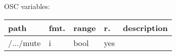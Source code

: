 \begin{snugshade}
{\footnotesize
\label{osctab:tascarapsndfileasync}
OSC variables:
\nopagebreak

\begin{tabularx}{\textwidth}{llllX}
\hline
path & fmt. & range & r. & description\\
\hline
/.../mute & i & bool & yes & \\
\hline
\end{tabularx}
}
\end{snugshade}
